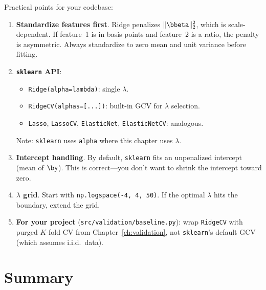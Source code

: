 Practical points for your codebase:

\begin{enumerate}[nosep]
  \item \textbf{Standardize features first}. Ridge penalizes $\|\bbeta\|_2^2$, which is scale-dependent. If feature~1 is in basis points and feature~2 is a ratio, the penalty is asymmetric. Always standardize to zero mean and unit variance before fitting.

  \item \textbf{\texttt{sklearn} API}:
    \begin{itemize}[nosep]
      \item \texttt{Ridge(alpha=lambda)}: single $\lambda$.
      \item \texttt{RidgeCV(alphas=[...])}: built-in GCV for $\lambda$ selection.
      \item \texttt{Lasso}, \texttt{LassoCV}, \texttt{ElasticNet}, \texttt{ElasticNetCV}: analogous.
    \end{itemize}
    Note: \texttt{sklearn} uses \texttt{alpha} where this chapter uses $\lambda$.

  \item \textbf{Intercept handling}. By default, \texttt{sklearn} fits an unpenalized intercept (mean of $\by$). This is correct---you don't want to shrink the intercept toward zero.

  \item \textbf{$\lambda$ grid}. Start with \texttt{np.logspace(-4, 4, 50)}. If the optimal $\lambda$ hits the boundary, extend the grid.

  \item \textbf{For your project} (\texttt{src/validation/baseline.py}): wrap \texttt{RidgeCV} with purged $K$-fold CV from Chapter~\ref{ch:validation}, not \texttt{sklearn}'s default GCV (which assumes i.i.d.\ data).
\end{enumerate}

\section{Summary}
\label{sec:regularized-summary}

